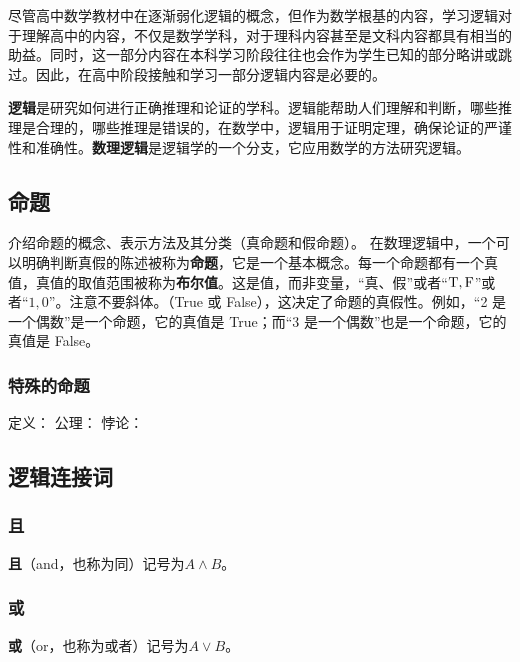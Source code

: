 
\begin{issues}
\issueDraft
\end{issues}

尽管高中数学教材中在逐渐弱化逻辑的概念，但作为数学根基的内容，学习逻辑对于理解高中的内容，不仅是数学学科，对于理科内容甚至是文科内容都具有相当的助益。同时，这一部分内容在本科学习阶段往往也会作为学生已知的部分略讲或跳过。因此，在高中阶段接触和学习一部分逻辑内容是必要的。

\textbf{逻辑}是研究如何进行正确推理和论证的学科。逻辑能帮助人们理解和判断，哪些推理是合理的，哪些推理是错误的，在数学中，逻辑用于证明定理，确保论证的严谨性和准确性。\textbf{数理逻辑}是逻辑学的一个分支，它应用数学的方法研究逻辑。


\subsection{命题}

介绍命题的概念、表示方法及其分类（真命题和假命题）。
在数理逻辑中，一个可以明确判断真假的陈述被称为\textbf{命题}，它是一个基本概念。每一个命题都有一个真值，真值的取值范围被称为\textbf{布尔值}。这是值，而非变量，“真、假”或者“${\rm T,F}$”或者“$1,0$”。注意不要斜体。（True 或 False），这决定了命题的真假性。例如，“2 是一个偶数”是一个命题，它的真值是 True；而“3 是一个偶数”也是一个命题，它的真值是 False。



\subsubsection{特殊的命题}
定义：
公理：
悖论：

\subsection{逻辑连接词}

\subsubsection{且}

\textbf{且}（and，也称为同）记号为$A\land B$。

\subsubsection{或}

\textbf{或}（or，也称为或者）记号为$A\lor B$。


